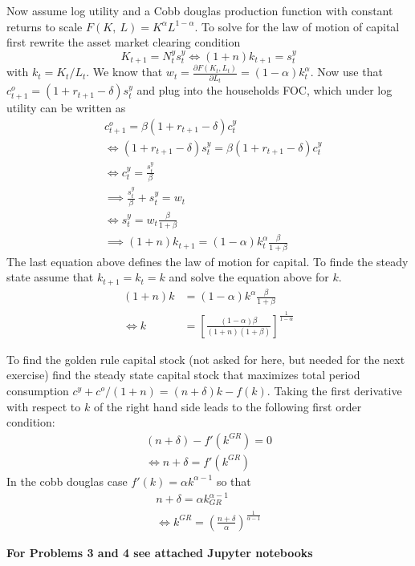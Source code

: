 Now assume log utility and a Cobb douglas production function with constant
returns to scale $F(K,~L) = K^\alpha L^{1 - \alpha}$. To solve for the law of
motion of capital first rewrite the asset market clearing condition
\begin{equation*}
  K_{t+1} = N_t^y s_t^y \iff (1 + n) k_{t+1} = s_t^y 
\end{equation*}
with $k_t = K_t / L_t$. We know that $w_t = \frac{\partial F(K_t,
  L_t)}{\partial L_t} = (1 - \alpha) k_t^\alpha$. Now use that
$c_{t+1}^o = (1 + r_{t+1} - \delta) s_t^y$ and plug into the households FOC,
which under log utility can be written as
\begin{align*}
  & c_{t+1}^o = \beta (1 + r_{t+1} - \delta) c_t^y \\
  &\iff (1 + r_{t+1} - \delta) s_t^y = \beta (1 + r_{t+1} - \delta) c_t^y \\
  &\iff c_t^y = \frac{s_t^y}{\beta} \\
  &\implies \frac{s_t^y}{\beta} + s_t^y = w_t \\
  &\iff s_t^y = w_t \frac{\beta}{1 + \beta} \\
  &\implies (1 + n) k_{t+1} = (1 - \alpha) k_t^\alpha \frac{\beta}{1 + \beta}
\end{align*}
The last equation above defines the law of motion for capital. To finde the
steady state assume that $k_{t+1} = k_t = k$ and solve the equation above for
$k$.
\begin{align*}
  (1 + n) k &= (1 - \alpha) k^\alpha \frac{\beta}{1 + \beta} \\
  \iff k &= \left[\frac{(1 - \alpha) \beta}{(1 + n) (1 +
           \beta)}\right]^{\frac{1}{1 - \alpha}}
\end{align*}

To find the golden rule capital stock (not asked for here, but needed for the
next exercise) find the steady state capital stock that maximizes total period
consumption $c^y + c^o / (1 + n) = (n + \delta) k - f(k)$.
Taking the first derivative with respect to $k$ of the right hand side leads to
the following first order condition:
\begin{align*}
  (n + \delta) - f'\left(k^{GR}\right) = 0 \\
  \iff n + \delta = f'\left(k^{GR}\right)
\end{align*}
In the cobb douglas case $f'(k) = \alpha k^{\alpha - 1}$ so that
\begin{align*}
  n + \delta = \alpha k_{GR}^{\alpha - 1} \\
  \iff k^{GR} = \left(\frac{n + \delta}{\alpha}\right)^{\frac{1}{\alpha - 1}}
\end{align*}


\textbf{For Problems 3 and 4 see attached Jupyter notebooks}


